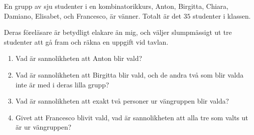 \documentclass[nobib]{tufte-handout}
\begin{document}
\begin{xca}
    En grupp av sju studenter i en kombinatorikkurs, Anton, Birgitta, Chiara, Damiano, Elisabet, och Francesco, är vänner. Totalt är det $35$ studenter i klassen.

    Deras föreläsare är betydligt elakare än mig, och väljer slumpmässigt ut tre studenter att gå fram och räkna en uppgift vid tavlan.

    \begin{enumerate}
        \item Vad är sannolikheten att Anton blir vald?
        \item Vad är sannolikheten att Birgitta blir vald, och de andra två som blir valda inte är med i deras lilla grupp?
        \item Vad är sannolikheten att exakt två personer ur vängruppen blir valda?
        \item Givet att Francesco blivit vald, vad är sannolikheten att alla tre som valts ut är ur vängruppen?
    \end{enumerate}
\end{xca}

%
%
\end{document}
